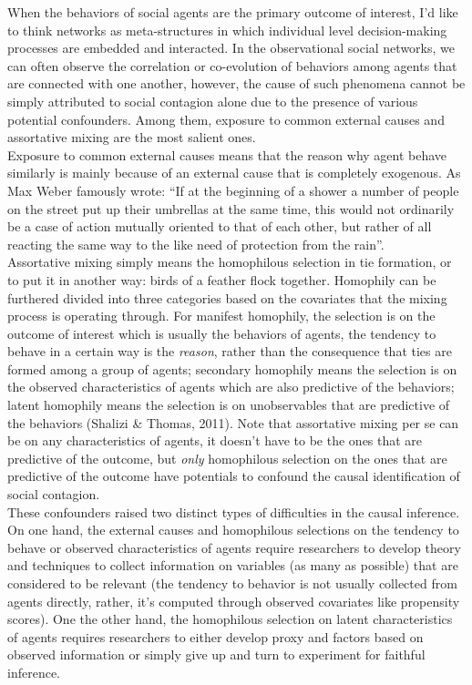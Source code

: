\documentclass[11pt]{article}
\begin{document}
When the behaviors of social agents are the primary outcome of interest, I'd like to think networks as meta-structures in which individual level decision-making processes are embedded and interacted. In the observational social networks, we can often observe the correlation or co-evolution of behaviors among agents that are connected with one another, however, the cause of such phenomena cannot be simply attributed to social contagion alone due to the presence of various potential confounders. Among them, exposure to common external causes and assortative mixing are the most salient ones. \\

Exposure to common external causes means that the reason why agent behave similarly is mainly because of an external cause that is completely exogenous. As Max Weber famously wrote: “If at the beginning of a shower a number of people on the street put up their umbrellas at the same time, this would not ordinarily be a case of action mutually oriented to that of each other, but rather of all reacting the same way to the like need of protection from the rain”.\\ 

Assortative mixing simply means the homophilous selection in tie formation, or to put it in another way: birds of a feather flock together. Homophily can be furthered divided into three categories based on the covariates that the mixing process is operating through. For manifest homophily, the selection is on the outcome of interest which is usually the behaviors of agents, the tendency to behave in a certain way is the \emph{reason}, rather than the consequence that ties are formed among a group of agents; secondary homophily means the selection is on the observed characteristics of agents which are also predictive of the behaviors; latent homophily means the selection is on unobservables that are predictive of the behaviors (Shalizi \& Thomas, 2011). Note that assortative mixing per se can be on any characteristics of agents, it doesn't have to be the ones that are predictive of the outcome, but \emph{only} homophilous selection on the ones that are predictive of the outcome have potentials to confound the causal identification of social contagion.\\

These confounders raised two distinct types of difficulties in the causal inference. On one hand, the external causes and homophilous selections on the tendency to behave or observed characteristics of agents require researchers to develop theory and techniques to collect information on variables (as many as possible) that are considered to be relevant (the tendency to behavior is not usually collected from agents directly, rather, it's computed through observed covariates like propensity scores). One the other hand, the homophilous selection on latent characteristics of agents requires researchers to either develop proxy and factors based on observed information or simply give up and turn to experiment for faithful inference.\\  
\end{document}
